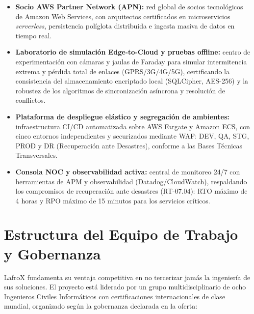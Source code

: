 \begin{itemize}
  \item \textbf{Socio AWS Partner Network (APN):} red global de socios tecnológicos de
        Amazon Web Services, con arquitectos certificados en microservicios
        \emph{serverless}, persistencia políglota distribuida e ingesta masiva de datos
        en tiempo real.
  \item \textbf{Laboratorio de simulación Edge-to-Cloud y pruebas offline:} centro de
        experimentación con cámaras y jaulas de Faraday para simular intermitencia
        extrema y pérdida total de enlaces (GPRS/3G/4G/5G), certificando la consistencia
        del almacenamiento encriptado local (SQLCipher, AES-256) y la robustez de los
        algoritmos de sincronización asíncrona y resolución de conflictos.
  \item \textbf{Plataforma de despliegue elástico y segregación de ambientes:}
        infraestructura CI/CD automatizada sobre AWS Fargate y Amazon ECS, con cinco
        entornos independientes y securizados mediante WAF: DEV, QA, STG, PROD y DR
        (Recuperación ante Desastres), conforme a las Bases Técnicas Transversales.
  \item \textbf{Consola NOC y observabilidad activa:} central de monitoreo 24/7 con
        herramientas de APM y observabilidad (Datadog/CloudWatch), respaldando los
        compromisos de recuperación ante desastres (RT-07.04): RTO máximo de 4 horas y
        RPO máximo de 15 minutos para los servicios críticos.
\end{itemize}

\section{Estructura del Equipo de Trabajo y Gobernanza}

LafroX fundamenta su ventaja competitiva en no tercerizar jamás la ingeniería de sus
soluciones. El proyecto está liderado por un grupo multidisciplinario de ocho Ingenieros
Civiles Informáticos con certificaciones internacionales de clase mundial, organizado
según la gobernanza declarada en la oferta:

